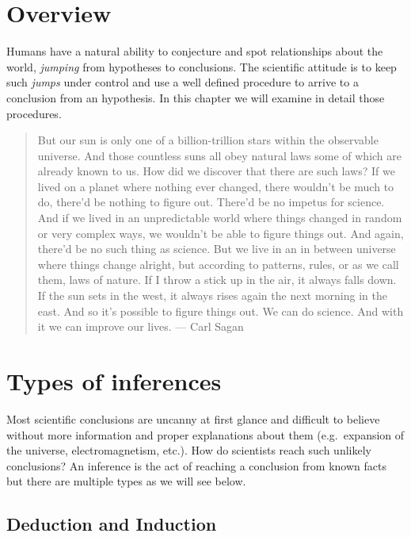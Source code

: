 \documentclass[
]{book}
\begin{document}
\hypertarget{overview}{%
\section{Overview}\label{overview}}

Humans have a natural ability to conjecture and spot relationships about the world, \emph{jumping} from hypotheses to conclusions. The scientific attitude is to keep such \emph{jumps} under control and use a well defined procedure to arrive to a conclusion from an hypothesis. In this chapter we will examine in detail those procedures.

\begin{quote}
But our sun is only one of a billion-trillion stars within the observable universe. And those countless suns all obey natural laws some of which are already known to us. How did we discover that there are such laws? If we lived on a planet where nothing ever changed, there wouldn't be much to do, there'd be nothing to figure out. There'd be no impetus for science. And if we lived in an unpredictable world where things changed in random or very complex ways, we wouldn't be able to figure things out. And again, there'd be no such thing as science. But we live in an in between universe where things change alright, but according to patterns, rules, or as we call them, laws of nature. If I throw a stick up in the air, it always falls down. If the sun sets in the west, it always rises again the next morning in the east. And so it's possible to figure things out. We can do science. And with it we can improve our lives. --- Carl Sagan
\end{quote}

\hypertarget{types-of-inferences}{%
\section{Types of inferences}\label{types-of-inferences}}

Most scientific conclusions are uncanny at first glance and difficult to believe without more information and proper explanations about them (e.g.~expansion of the universe, electromagnetism, etc.). How do scientists reach such unlikely conclusions? An inference is the act of reaching a conclusion from known facts but there are multiple types as we will see below.

\hypertarget{deduction-and-induction}{%
\subsection{Deduction and Induction}\label{deduction-and-induction}}
\end{document}
